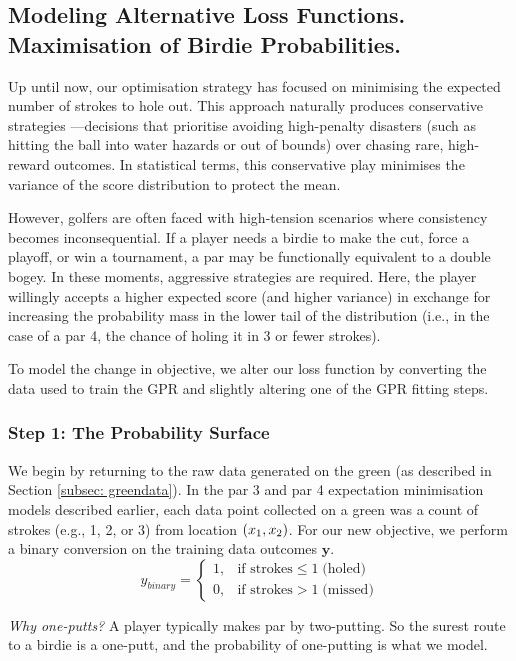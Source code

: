\documentclass[11pt, letterpaper]{article}
\begin{document}
\subsection{Modeling Alternative Loss Functions. Maximisation of Birdie Probabilities.}
\label{subsec: par4b}

Up until now, our optimisation strategy has focused on minimising the expected number of strokes to hole out. This approach naturally produces conservative strategies ---decisions that prioritise avoiding high-penalty disasters (such as hitting the ball into water hazards or out of bounds) over chasing rare, high-reward outcomes. In statistical terms, this conservative play minimises the variance of the score distribution to protect the mean.

However, golfers are often faced with high-tension scenarios where consistency becomes inconsequential. If a player needs a birdie to make the cut, force a playoff, or win a tournament, a par may be functionally equivalent to a double bogey. In these moments, aggressive strategies are required. Here, the player willingly accepts a higher expected score (and higher variance) in exchange for increasing the probability mass in the lower tail of the distribution (i.e., in the case of a par 4, the chance of holing it in 3 or fewer strokes).

To model the change in objective, we alter our loss function by converting the data used to train the GPR and slightly altering one of the GPR fitting steps.



\subsubsection{Step 1: The Probability Surface}
We begin by returning to the raw data generated on the green (as described in Section \ref{subsec: greendata}). In the par 3 and par 4 expectation minimisation models described earlier, each data point collected on a green was a count of strokes (e.g., 1, 2, or 3) from location $(x_1, x_2)$. For our new objective, we perform a binary conversion on the training data outcomes $\mathbf{y}$. 
\[y_{binary} = \begin{cases}
1, & \text{if strokes} \le 1 \;\text{(holed)} \\
0, & \text{if strokes} > 1 \;\text{(missed)}
\end{cases}\]

\textit{Why one-putts?} A player typically makes par by two-putting. So the surest route to a birdie is a one-putt, and the probability of one-putting is what we model.
\end{document}
